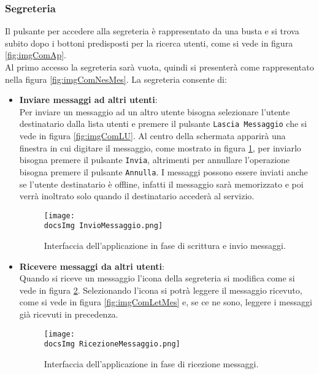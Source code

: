 {{\subsubsection{Segreteria}
Il pulsante per accedere alla segreteria è rappresentato da una busta e si trova subito dopo i bottoni predisposti per la ricerca utenti, come si vede in figura \ref{fig:imgComAp}.\\
Al primo accesso la segreteria sarà vuota, quindi si presenterà come rappresentato nella figura \ref{fig:imgComNesMes}.
La segreteria consente di:
\begin{itemize}
\item \textbf{Inviare messaggi ad altri utenti}:\\
Per inviare un messaggio ad un altro utente bisogna selezionare l'utente destinatario dalla lista utenti e premere il pulsante \texttt{Lascia Messaggio} che si vede in figura \ref{fig:imgComLU}. Al centro della schermata apparirà una finestra in cui digitare il messaggio, come mostrato in figura \ref{fig:imgComInvMes}, per inviarlo bisogna premere il pulsante \texttt{Invia}, altrimenti per annullare l'operazione bisogna premere il pulsante \texttt{Annulla}. I messaggi possono essere inviati anche se l'utente destinatario è offline, infatti il messaggio sarà memorizzato e poi verrà inoltrato solo quando il destinatario accederà al servizio.\\

\begin{figure}[h!]
	\centering
		\texttt{[image: \\docsImg InvioMessaggio.png]}
		\caption{Interfaccia dell'applicazione in fase di scrittura e invio messaggi.} 
		\label{fig:imgComInvMes}
	\end{figure}

\item \textbf{Ricevere messaggi da altri utenti}:\\
Quando si riceve un messaggio l'icona della segreteria si modifica come si vede in figura \ref{fig:imgComRicMes}. Selezionando l'icona si potrà leggere il messaggio ricevuto, come si vede in figura \ref{fig:imgComLetMes} e, se ce ne sono, leggere i messaggi già ricevuti in precedenza.\\

\begin{figure}[h!]
	\centering
		\texttt{[image: \\docsImg RicezioneMessaggio.png]}
		\caption{Interfaccia dell'applicazione in fase di ricezione messaggi.} 
		\label{fig:imgComRicMes}
	\end{figure}
	

\end{itemize}}}
